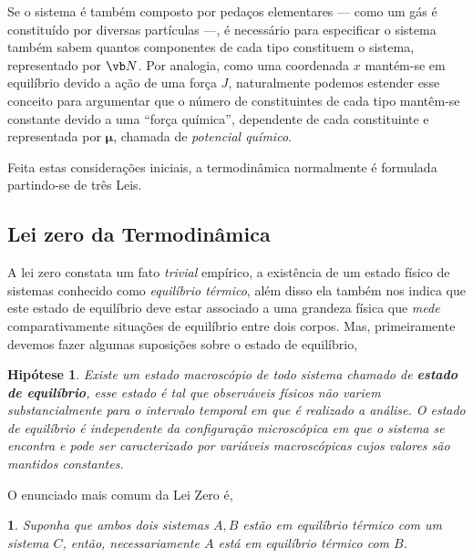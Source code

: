 \documentclass[twoside,reqno]{amsart}
\numberwithin{equation}{section}
\newtheorem{hipotese}{Hipótese}[section]
\newcommand{\thistheoremname}{}
\newtheorem*{genericthm}{\thistheoremname}
\newenvironment{namedthm}[1]
  {\renewcommand{\thistheoremname}{#1}
   \begin{genericthm}}
  {\end{genericthm}}
\begin{document}
\begin{refsection}
Se o sistema é também composto por pedaços elementares --- como um gás é constituído por diversas partículas 
---, é necessário para especificar o sistema também sabem quantos componentes de cada tipo constituem o 
sistema, representado por $\vb N$. Por analogia, como uma coordenada $x$ mantém-se em equilíbrio devido a 
ação de uma força $J$, naturalmente podemos estender esse conceito para argumentar que o número de 
constituintes de cada tipo mantêm-se constante devido a uma ``força química'', dependente de cada 
constituinte e representada por $\boldsymbol \mu$, chamada de \emph{potencial químico}.

Feita estas considerações iniciais, a termodinâmica normalmente é formulada partindo-se de três Leis.

\subsection{Lei zero da Termodinâmica}

A lei zero constata um fato \emph{trivial} empírico, a existência de um estado físico de sistemas conhecido 
como \emph{equilíbrio térmico}, além disso ela também nos indica que este estado de equilíbrio deve estar 
associado a uma grandeza física que \emph{mede} comparativamente situações de equilíbrio entre dois corpos. Mas, primeiramente devemos fazer algumas suposições sobre o estado de equilíbrio,

\begin{hipotese}
    Existe um estado macroscópio de todo sistema chamado de \textbf{estado de equilíbrio}, 
    esse estado é tal que observáveis físicos não variem substancialmente para o intervalo 
    temporal em que é realizado a análise. O estado de equilíbrio é independente da 
    configuração microscópica em que o sistema se encontra e pode ser caracterizado por 
    variáveis macroscópicas cujos valores são mantidos constantes.
\end{hipotese}

O enunciado mais comum da Lei Zero é,

\begin{namedthm}{Lei Zero}
    Suponha que ambos dois sistemas $A,B$ estão em equilíbrio térmico com um sistema $C$, então, necessariamente 
    $A$ está em equilíbrio térmico com $B$.
\end{namedthm}


\end{refsection}
\end{document}
